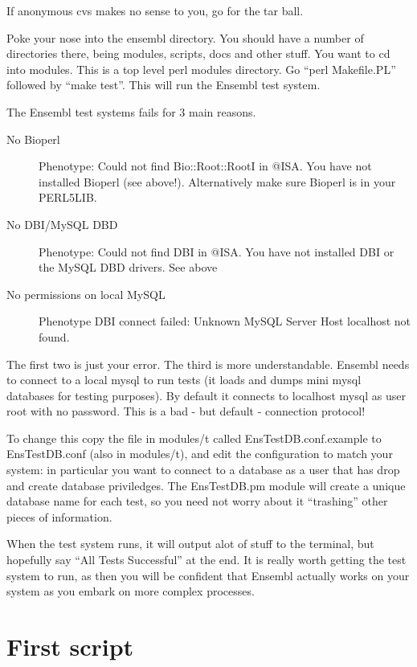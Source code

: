 \documentclass[11pt,a4paper]{article}
\begin{document}
If anonymous cvs makes no sense to you, go for the tar ball.

Poke your nose into the ensembl directory. You should have a number of directories there, being
modules, scripts, docs and other stuff. You want to cd into modules. This is a top level 
perl modules directory. Go ``perl Makefile.PL'' followed by ``make test''. This will run the
Ensembl test system.

The Ensembl test systems fails for 3 main reasons.

\begin{description}
\item[No Bioperl] Phenotype: Could not find Bio::Root::RootI in @ISA. You have not installed Bioperl
(see above!). Alternatively make sure Bioperl is in your PERL5LIB.
\item[No DBI/MySQL DBD] Phenotype: Could not find DBI in @ISA. You have not installed DBI or the
MySQL DBD drivers. See above 

\item[No permissions on local MySQL]
Phenotype DBI connect failed: Unknown MySQL Server Host localhost not
found.  

\end{description} 

The first two is just your error. The third is more understandable. Ensembl needs to connect to 
a local mysql to run tests (it loads and dumps mini mysql databases for testing purposes). By
default it connects to localhost mysql as user root with no password. This is a bad - but default -
connection protocol!

To change this copy the file in modules/t called
EnsTestDB.conf.example to EnsTestDB.conf (also in modules/t), and edit
the configuration to match your system: in particular you want to
connect to a database as a user that has drop and create database
priviledges. The EnsTestDB.pm module will create a unique database
name for each test, so you need not worry about it ``trashing'' other
pieces of information.

When the test system runs, it will output alot of stuff to the terminal, but hopefully say
``All Tests Successful'' at the end. It is really worth getting the test system to run, as then you
will be confident that Ensembl actually works on your system as you embark on more complex processes.

\section{First script}
\end{document}
